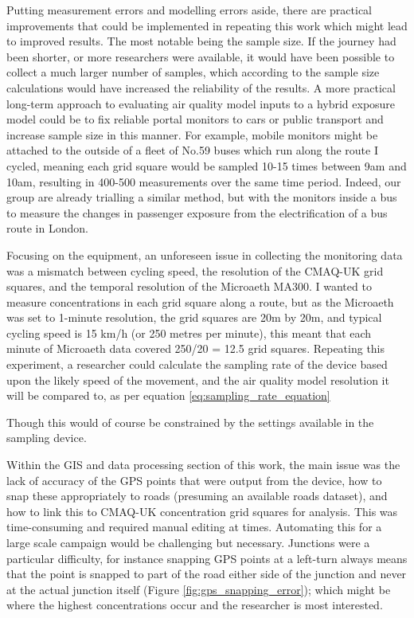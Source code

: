 Putting measurement errors and modelling errors aside, there are practical improvements that could be implemented in repeating this work which might lead to improved results. The most notable being the sample size. If the journey had been shorter, or more researchers were available, it would have been possible to collect a much larger number of samples, which according to the sample size calculations would have increased the reliability of the results. A more practical long-term approach to evaluating air quality model inputs to a hybrid exposure model could be to fix reliable portal monitors to cars or public transport and increase sample size in this manner. For example, mobile monitors might be attached to the outside of a fleet of No.59 buses which run along the route I cycled, meaning each grid square would be sampled 10-15 times between 9am and 10am, resulting in 400-500 measurements over the same time period. Indeed, our group are already trialling a similar method, but with the monitors inside a bus to measure the changes in passenger exposure from the electrification of a bus route in London.

Focusing on the equipment, an unforeseen issue in collecting the monitoring data was a mismatch between cycling speed, the resolution of the CMAQ-UK grid squares, and the temporal resolution of the Microaeth MA300. I wanted to measure concentrations in each grid square along a route, but as the Microaeth was set to 1-minute resolution, the grid squares are 20m by 20m, and typical cycling speed is 15 km/h (or 250 metres per minute), this meant that each minute of Microaeth data covered 250/20 = 12.5 grid squares. Repeating this experiment, a researcher could calculate the sampling rate of the device based upon the likely speed of the movement, and the air quality model resolution it will be compared to, as per equation \ref{eq:sampling_rate_equation}


Though this would of course be constrained by the settings available in the sampling device.

Within the GIS and data processing section of this work, the main issue was the lack of accuracy of the GPS points that were output from the device, how to snap these appropriately to roads (presuming an available roads dataset), and how to link this to CMAQ-UK concentration grid squares for analysis. This was time-consuming and required manual editing at times. Automating this for a large scale campaign would be challenging but necessary. Junctions were a particular difficulty, for instance snapping GPS points at a left-turn always means that the point is snapped to part of the road either side of the junction and never at the actual junction itself (Figure \ref{fig:gps_snapping_error}); which might be where the highest concentrations occur and the researcher is most interested.

